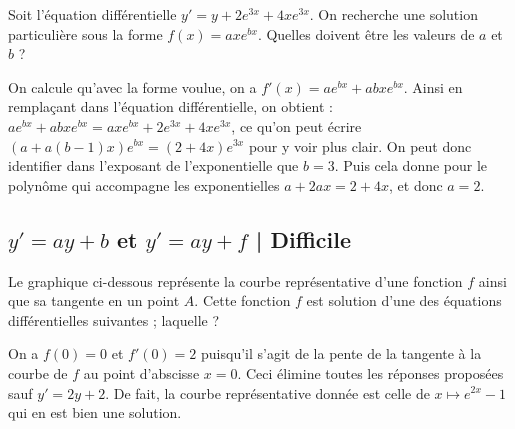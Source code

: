 \begin{question}
Soit l'équation différentielle $y'=y+2e^{3x} + 4x e^{3x}$. On recherche une solution particulière sous la forme $f(x) = ax e^{bx}$. Quelles doivent être les valeurs de $a$ et $b$ ?
\begin{answers}
\end{answers}
\begin{explanations}
On calcule qu'avec la forme voulue, on a $f'(x) = a e^{bx} + abxe^{bx}$. Ainsi en remplaçant dans l'équation différentielle, on obtient : $a e^{bx} + abxe^{bx} = ax e^{bx} + 2e^{3x} + 4x e^{3x}$, ce qu'on peut écrire $(a+a(b-1)x)e^{bx} = (2+4x)e^{3x}$ pour y voir plus clair. On peut donc identifier dans l'exposant de l'exponentielle que $b=3$. Puis cela donne pour le polynôme qui accompagne les exponentielles $a+2ax = 2 + 4x$, et donc $a=2$.
\end{explanations}
\end{question}



\subsection{$y'=ay+b$ et $y'=ay+f$ | Difficile}


\begin{question}
Le graphique ci-dessous représente la courbe représentative d'une fonction \(f\) ainsi que sa tangente en un point \(A\). Cette fonction \(f\) est solution d'une des équations différentielles suivantes ; laquelle ?


\begin{answers}
\end{answers}
\begin{explanations} 
On a \(f(0)=0\) et \(f'(0)=2\) puisqu'il s'agit de la pente de la tangente à la courbe de $f$ au point d'abscisse $x=0$. Ceci élimine toutes les réponses proposées sauf \(y'=2y+2\). De fait, la courbe représentative donnée est celle de \(x\mapsto  e^{2x}-1\) qui en est bien une solution.	
\end{explanations}
\end{question}


